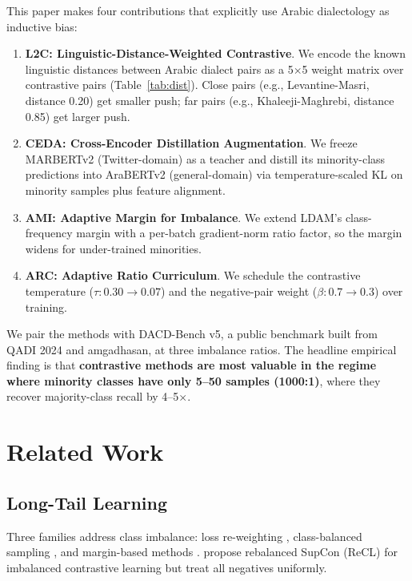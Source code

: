 \documentclass[11pt,a4paper,twocolumn]{article}
\newcommand{\method}{L2C}
\newcommand{\bench}{DACD-Bench}
\newcommand{\ceda}{CEDA}
\newcommand{\ami}{AMI}
\newcommand{\arc}{ARC}
\begin{document}
This paper makes four contributions that explicitly use Arabic
dialectology as inductive bias:
\begin{enumerate}\itemsep0pt
\item \textbf{\method{}: Linguistic-Distance-Weighted Contrastive}.
We encode the known linguistic distances between Arabic dialect
pairs as a 5$\times$5 weight matrix over contrastive pairs (Table~\ref{tab:dist}).
Close pairs (e.g., Levantine-Masri, distance 0.20) get smaller push;
far pairs (e.g., Khaleeji-Maghrebi, distance 0.85) get larger push.

\item \textbf{\ceda{}: Cross-Encoder Distillation Augmentation}.
We freeze MARBERTv2 (Twitter-domain) as a teacher and distill its
minority-class predictions into AraBERTv2 (general-domain) via
temperature-scaled KL on minority samples plus feature alignment.

\item \textbf{\ami{}: Adaptive Margin for Imbalance}.
We extend LDAM's class-frequency margin with a per-batch gradient-norm
ratio factor, so the margin widens for under-trained minorities.

\item \textbf{\arc{}: Adaptive Ratio Curriculum}.
We schedule the contrastive temperature ($\tau: 0.30\!\to\!0.07$)
and the negative-pair weight ($\beta: 0.7\!\to\!0.3$) over training.
\end{enumerate}

We pair the methods with \bench{} v5, a public benchmark built from
QADI 2024 and amgadhasan, at three imbalance ratios. The headline
empirical finding is that \textbf{contrastive methods are most
valuable in the regime where minority classes have only 5--50 samples
(1000:1)}, where they recover majority-class recall by 4--5$\times$.

\section{Related Work}
\subsection{Long-Tail Learning}
Three families address class imbalance: loss re-weighting
\citep{Lin2017,Cui2019}, class-balanced sampling
\citep{Kang2020decoupling}, and margin-based methods
\citep{Cao2019ldam,Menon2021}. \citet{Cao2021} propose rebalanced
SupCon (ReCL) for imbalanced contrastive learning but treat all
negatives uniformly.
\end{document}
